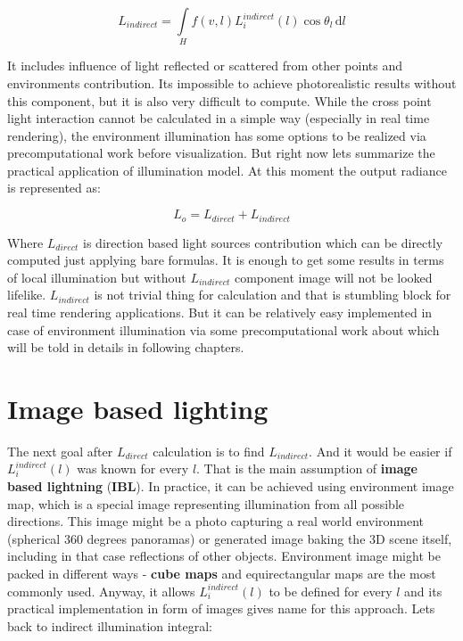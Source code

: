 \[L_{indirect} = \int\limits_H f(v, l) L_i^{indirect}(l) \cos\theta_l\, \mathrm{d}l\]

It includes influence of light reflected or scattered from other points and environment\textquotesingle{}s contribution. It\textquotesingle{}s impossible to achieve photorealistic results without this component, but it is also very difficult to compute. While the cross point light interaction cannot be calculated in a simple way (especially in real time rendering), the environment illumination has some options to be realized via precomputational work before visualization. But right now lets summarize the practical application of illumination model. At this moment the output radiance is represented as\+:

\[L_o = L_{direct} + L_{indirect}\]

Where $L_{direct}$ is direction based light sources contribution which can be directly computed just applying bare formulas. It is enough to get some results in terms of local illumination but without $L_{indirect}$ component image will not be looked lifelike. $L_{indirect}$ is not trivial thing for calculation and that is stumbling block for real time rendering applications. But it can be relatively easy implemented in case of environment illumination via some precomputational work about which will be told in details in following chapters.\hypertarget{specification__pbr_math_pbr_image_based_lighting}{}\section{Image based lighting}\label{specification__pbr_math_pbr_image_based_lighting}
The next goal after $L_{direct}$ calculation is to find $L_{indirect}$. And it would be easier if $L_i^{indirect}(l)$ was known for every $l$. That is the main assumption of {\bfseries image based lightning} ({\bfseries I\+BL}). In practice, it can be achieved using environment image map, which is a special image representing illumination from all possible directions. This image might be a photo capturing a real world environment (spherical 360 degrees panoramas) or generated image baking the 3D scene itself, including in that case reflections of other objects. Environment image might be packed in different ways -\/ {\bfseries cube maps} and equirectangular maps are the most commonly used. Anyway, it allows $L_i^{indirect}(l)$ to be defined for every $l$ and its practical implementation in form of images gives name for this approach. Lets back to indirect illumination integral\+:

